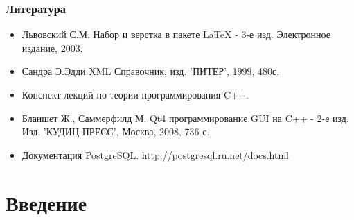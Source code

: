 \documentclass[12pt,a4paper,oneside]{article} %
\begin{document}
\subsubsection*{Литература}
\begin{itemize}
\item Львовский С.М. Набор и верстка в пакете LaTeX - 3-е изд. \linebreak
Электронное издание, 2003.
\item Сандра Э.Эдди XML Справочник, изд. 'ПИТЕР', 1999, 480с.
\item Конспект лекций по теории программирования C++.
\item Бланшет Ж., Саммерфилд М. Qt4 программирование GUI на C++ - 2-е изд.\linebreak
Изд. 'КУДИЦ-ПРЕСС', Москва, 2008, 736 с.
\item Документация PostgreSQL. http://postgresql.ru.net/docs.html
\end{itemize}
\newpage
\tableofcontents

\newpage
\section{Введение}
\end{document}
